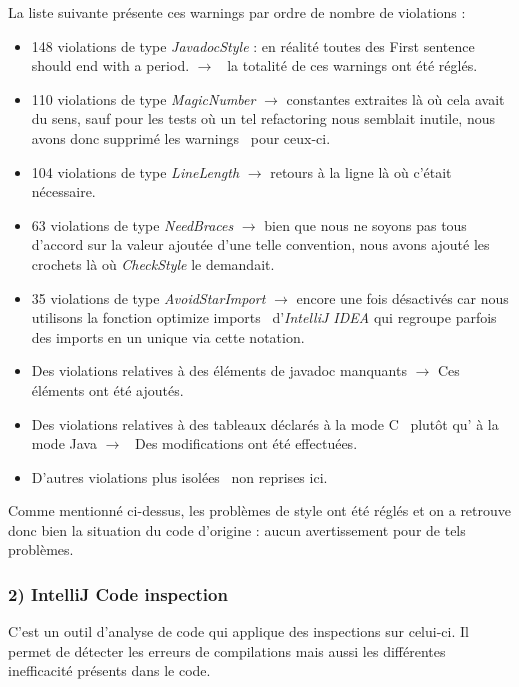 \documentclass[12pt, openany]{report}
\begin{document}
La liste suivante présente ces warnings par ordre de nombre de \og violations \fg :\\
\begin{itemize}
	\item 148 violations de type \textit{JavadocStyle} : en réalité toutes des \og First sentence should end with a period. \fg $\rightarrow$ \, la totalité de ces warnings ont été réglés. 
	\item 110 violations de type \textit{MagicNumber} $\rightarrow$ constantes extraites là où cela avait du sens, sauf pour les tests où un tel refactoring nous semblait inutile, nous avons donc supprimé les \og warnings \fg \, pour ceux-ci.
	\item 104 violations de type \textit{LineLength} $\rightarrow$ retours à la ligne là où c'était nécessaire.
	\item 63 violations de type \textit{NeedBraces} $\rightarrow$ bien que nous ne soyons pas tous d'accord sur la valeur ajoutée d'une telle convention, nous avons ajouté les crochets là où \textit{CheckStyle} le demandait.
	\item 35 violations de type \textit{AvoidStarImport} $\rightarrow$ encore une fois désactivés car nous utilisons la fonction \og optimize imports \fg \, d'\textit{IntelliJ IDEA} qui regroupe parfois des imports en un unique via cette notation.
	\item Des violations relatives à des éléments de javadoc manquants $\rightarrow$ Ces éléments ont été ajoutés.
	\item Des violations relatives à des tableaux déclarés à la \og mode C \fg \, plutôt qu' à la \og mode Java \fg $\rightarrow$ \, Des modifications ont été effectuées.
	\item D'autres violations plus \og isolées \fg \, non reprises ici.
\end{itemize}
Comme mentionné ci-dessus, les problèmes de style ont été réglés et on a retrouve donc bien la situation du code d'origine : aucun avertissement pour de tels problèmes.

\subsubsection*{2) IntelliJ Code inspection}

C'est un outil d'analyse de code qui applique des inspections sur celui-ci. Il permet de détecter les erreurs de compilations mais aussi les différentes inefficacité présents dans le code.
\end{document}
